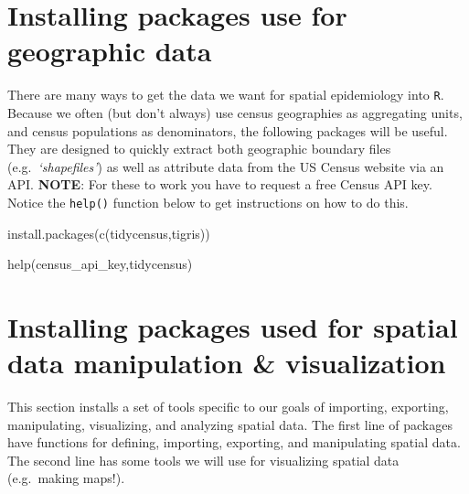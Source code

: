 \documentclass[
]{book}
\newenvironment{Shaded}{\begin{snugshade}}{\end{snugshade}}
\newcommand{\FunctionTok}[1]{\textcolor[rgb]{0.00,0.00,0.00}{#1}}
\newcommand{\NormalTok}[1]{#1}
\newcommand{\StringTok}[1]{\textcolor[rgb]{0.31,0.60,0.02}{#1}}
\begin{document}
\hypertarget{installing-packages-use-for-geographic-data}{%
\section*{Installing packages use for geographic data}\label{installing-packages-use-for-geographic-data}}

There are many ways to get the data we want for spatial epidemiology into \texttt{R}. Because we often (but don't always) use census geographies as aggregating units, and census populations as denominators, the following packages will be useful. They are designed to quickly extract both geographic boundary files (e.g.~\emph{`shapefiles'}) as well as attribute data from the US Census website via an API. \textbf{NOTE}: For these to work you have to request a free Census API key. Notice the \texttt{help()} function below to get instructions on how to do this.

\begin{Shaded}
\begin{Highlighting}[]
\FunctionTok{install.packages}\NormalTok{(}\FunctionTok{c}\NormalTok{(}\StringTok{\textquotesingle{}tidycensus\textquotesingle{}}\NormalTok{,}\StringTok{\textquotesingle{}tigris\textquotesingle{}}\NormalTok{)) }

\FunctionTok{help}\NormalTok{(}\StringTok{\textquotesingle{}census\_api\_key\textquotesingle{}}\NormalTok{,}\StringTok{\textquotesingle{}tidycensus\textquotesingle{}}\NormalTok{)}
\end{Highlighting}
\end{Shaded}

\hypertarget{installing-packages-used-for-spatial-data-manipulation-visualization}{%
\section*{Installing packages used for spatial data manipulation \& visualization}\label{installing-packages-used-for-spatial-data-manipulation-visualization}}

This section installs a set of tools specific to our goals of importing, exporting, manipulating, visualizing, and analyzing spatial data. The first line of packages have functions for defining, importing, exporting, and manipulating spatial data. The second line has some tools we will use for visualizing spatial data (e.g.~making maps!).
\end{document}
